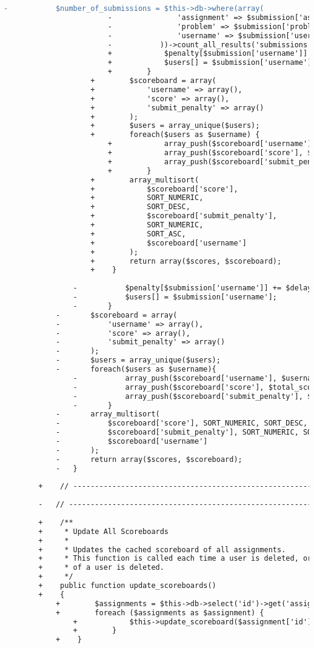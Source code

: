\begin{lstlisting}[language=diff, caption=Perubahan pada kode Scoreboard\_model.php]
						-			$number_of_submissions = $this->db->where(array(
						-				'assignment' => $submission['assignment'],
						-				'problem' => $submission['problem'],
						-				'username' => $submission['username'],
						-			))->count_all_results('submissions');
						+            $penalty[$submission['username']] += $delay + $number_of_submissions * $submit_penalty;
						+            $users[] = $submission['username'];
						+        }
					+        $scoreboard = array(
					+            'username' => array(),
					+            'score' => array(),
					+            'submit_penalty' => array()
					+        );
					+        $users = array_unique($users);
					+        foreach($users as $username) {
						+            array_push($scoreboard['username'], $username);
						+            array_push($scoreboard['score'], $total_score[$username]);
						+            array_push($scoreboard['submit_penalty'], $penalty[$username]);
						+        }
					+        array_multisort(
					+            $scoreboard['score'],
					+            SORT_NUMERIC,
					+            SORT_DESC,
					+            $scoreboard['submit_penalty'],
					+            SORT_NUMERIC,
					+            SORT_ASC,
					+            $scoreboard['username']
					+        );
					+        return array($scores, $scoreboard);
					+    }
				
				-			$penalty[$submission['username']] += $delay + $number_of_submissions*$submit_penalty;
				-			$users[] = $submission['username'];
				-		}
			-		$scoreboard = array(
			-			'username' => array(),
			-			'score' => array(),
			-			'submit_penalty' => array()
			-		);
			-		$users = array_unique($users);
			-		foreach($users as $username){
				-			array_push($scoreboard['username'], $username);
				-			array_push($scoreboard['score'], $total_score[$username]);
				-			array_push($scoreboard['submit_penalty'], $penalty[$username]);
				-		}
			-		array_multisort(
			-			$scoreboard['score'], SORT_NUMERIC, SORT_DESC,
			-			$scoreboard['submit_penalty'], SORT_NUMERIC, SORT_ASC,
			-			$scoreboard['username']
			-		);
			-		return array($scores, $scoreboard);
			-	}
		
		+    // ------------------------------------------------------------------------
		
		-	// ------------------------------------------------------------------------
		
		+    /**
		+     * Update All Scoreboards
		+     *
		+     * Updates the cached scoreboard of all assignments.
		+     * This function is called each time a user is deleted, or all submissions
		+     * of a user is deleted.
		+     */
		+    public function update_scoreboards()
		+    {
			+        $assignments = $this->db->select('id')->get('assignments')->result_array();
			+        foreach ($assignments as $assignment) {
				+            $this->update_scoreboard($assignment['id']);
				+        }
			+    }
		

\end{lstlisting}
